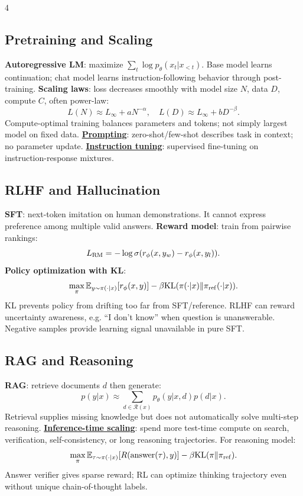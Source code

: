\documentclass{article}
\newcommand{\key}[1]{\textbf{#1}}
\newcommand{\lowterm}[1]{\textbf{\underline{#1}}}
\newcommand{\E}{\mathbb{E}}
\newcommand{\KL}{\mathrm{KL}}
\newcommand{\1}{\mathbf 1}
\begin{document}
\begin{multicols*}{4}
\subsection{Pretraining and Scaling}
\key{Autoregressive LM}: maximize $\sum_t\log p_\theta(x_t|x_{<t})$. Base model learns continuation; chat model learns instruction-following behavior through post-training. \key{Scaling laws}: loss decreases smoothly with model size $N$, data $D$, compute $C$, often power-law:
\[
L(N)\approx L_\infty+aN^{-\alpha},\quad
L(D)\approx L_\infty+bD^{-\beta}.
\]
Compute-optimal training balances parameters and tokens; not simply largest model on fixed data. \lowterm{Prompting}: zero-shot/few-shot describes task in context; no parameter update. \lowterm{Instruction tuning}: supervised fine-tuning on instruction-response mixtures.

\subsection{RLHF and Hallucination}
\key{SFT}: next-token imitation on human demonstrations. It cannot express preference among multiple valid answers. \key{Reward model}: train from pairwise rankings:
\[
L_{\rm RM}=-\log\sigma(r_\phi(x,y_w)-r_\phi(x,y_l)).
\]
\key{Policy optimization with KL}:
\[
\max_\pi\E_{y\sim\pi(\cdot|x)}[r_\phi(x,y)]-\beta\KL(\pi(\cdot|x)\|\pi_{\rm ref}(\cdot|x)).
\]
KL prevents policy from drifting too far from SFT/reference. RLHF can reward uncertainty awareness, e.g. ``I don't know'' when question is unanswerable. Negative samples provide learning signal unavailable in pure SFT.

\subsection{RAG and Reasoning}
\key{RAG}: retrieve documents $d$ then generate:
\[
p(y|x)\approx\sum_{d\in\mathcal R(x)}p_\theta(y|x,d)p(d|x).
\]
Retrieval supplies missing knowledge but does not automatically solve multi-step reasoning. \lowterm{Inference-time scaling}: spend more test-time compute on search, verification, self-consistency, or long reasoning trajectories. For reasoning model:
\[
\max_\pi \E_{\tau\sim\pi(\cdot|x)}[R(\operatorname{answer}(\tau),y)]-\beta\KL(\pi\|\pi_{\rm ref}).
\]
Answer verifier gives sparse reward; RL can optimize thinking trajectory even without unique chain-of-thought labels.


\end{multicols*}
\end{document}
